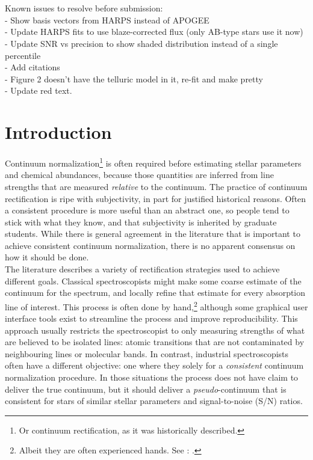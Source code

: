 \documentclass[modern]{aastex631}
\newcommand{\todo}[1]{\textcolor{tab:red}{#1}}
\begin{document}
\keywords{\todo{Some --- keywords --- here}}

\section*{}\noindent\todo{
Known issues to resolve before submission:\\
- Show basis vectors from HARPS instead of APOGEE\\
- Update HARPS fits to use blaze-corrected flux (only AB-type stars use it now)\\
- Update SNR vs precision to show shaded distribution instead of a single percentile\\
- Add citations\\
- Figure 2 doesn't have the telluric model in it, re-fit and make pretty\\
- Update red text.
}


\clearpage
\section{Introduction}\label{sec:intro}

Continuum normalization\footnote{Or continuum rectification, as it was historically described.} is often required before estimating stellar parameters and chemical abundances, because those quantities are inferred from line strengths that are measured \emph{relative} to the continuum.
The practice of continuum rectification is ripe with subjectivity, in part for justified historical reasons. Often a consistent procedure is more useful than an abstract one, so people tend to stick with what they know, and that subjectivity is inherited by graduate students. While there is general agreement in the literature that is important to achieve consistent continuum normalization, there is no apparent consensus on how it should be done.\\

The literature describes a variety of rectification strategies used to achieve different goals. Classical spectroscopists might make some coarse estimate of the continuum for the spectrum, and locally refine that estimate for every absorption line of interest. This process is often done by hand,\footnote{Albeit they are often experienced hands. See \citet{Bensby:2014}: .} although some graphical user interface tools exist to streamline the process and improve reproducibility. This approach usually restricts the spectroscopist to only measuring strengths of what are believed to be isolated lines: atomic transitions that are not contaminated by neighbouring lines or molecular bands. In contrast, industrial spectroscopists often have a different objective: one where they solely for a \emph{consistent} continuum normalization procedure. In those situations the process does not have claim to deliver the true continuum, but it should deliver a \emph{pseudo}-continuum that is consistent for stars of similar stellar parameters and signal-to-noise (S/N) ratios.\\
\end{document}
